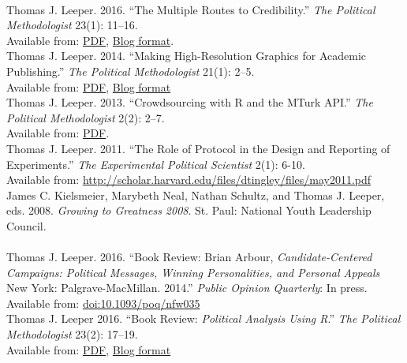 \documentclass[12pt]{article}
\newcommand{\topic}[1]{\pagebreak[3]\indent {\color{lg}{\footnotesize #1 }}\\}
\newcommand{\entry}[1]{\indent {\color{lg}\guillemotright}\hspace{2pt}#1\vspace{.25em}\\}
\begin{document}
\topic{Other Academic Publications}
	\entry{Thomas J. Leeper. 2016. ``The Multiple Routes to Credibility.'' \textit{The Political Methodologist} 23(1): 11--16.\\ Available from: \href{https://thepoliticalmethodologist.files.wordpress.com/2016/02/tpm_v23_n1.pdf}{PDF}, \href{https://thepoliticalmethodologist.com/2015/12/21/the-multiple-routes-to-credibility/}{Blog format}.}
	\entry{Thomas J. Leeper. 2014. ``Making High-Resolution Graphics for Academic Publishing.'' \textit{The Political Methodologist} 21(1): 2--5.\\ Available from: \href{https://thepoliticalmethodologist.files.wordpress.com/2014/06/tpm_v21_n12.pdf}{PDF}, \href{https://thepoliticalmethodologist.com/2013/11/25/making-high-resolution-graphics-for-academic-publishing/}{Blog format}}
	\entry{Thomas J. Leeper. 2013. ``Crowdsourcing with R and the MTurk API.'' \textit{The Political Methodologist} 2(2): 2--7.\\ Available from: \href{https://thepoliticalmethodologist.files.wordpress.com/2013/09/tpm_v20_n21.pdf}{PDF}.}
	\entry{Thomas J. Leeper. 2011. ``The Role of Protocol in the Design and Reporting of Experiments.'' \textit{The Experimental Political Scientist} 2(1): 6-10.\\ Available from: \url{http://scholar.harvard.edu/files/dtingley/files/may2011.pdf}}
	\entry{James C. Kielsmeier, Marybeth Neal, Nathan Schultz, and Thomas J. Leeper, eds. 2008. \textit{Growing to Greatness 2008}. St. Paul: National Youth Leadership Council.}

\topic{Book Reviews}
	\entry{Thomas J. Leeper. 2016. ``Book Review: Brian Arbour, \textit{Candidate-Centered Campaigns: Political Messages, Winning Personalities, and Personal Appeals} New York: Palgrave-MacMillan. 2014.'' \textit{Public Opinion Quarterly}: In press. Available from: \href{http://doi.org/10.1093/poq/nfw035}{doi:10.1093/poq/nfw035}}
	\entry{Thomas J. Leeper 2016. ``Book Review: \textit{Political Analysis Using R}.'' \textit{The Political Methodologist} 23(2): 17--19.\\ Available from: \href{https://thepoliticalmethodologist.files.wordpress.com/2016/08/tpm_v23_n2.pdf}{PDF}, \href{https://thepoliticalmethodologist.com/2016/05/25/book-review-political-analysis-using-r/}{Blog format}}
\end{document}
